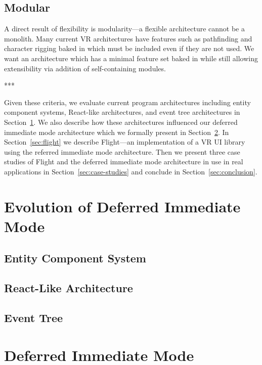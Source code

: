 \documentclass[conference,12pt]{IEEEtran}
\begin{document}
\subsection{Modular}
A direct result of flexibility is modularity---a flexible architecture cannot be
a monolith. Many current VR architectures have features such as pathfinding and
character rigging baked in which must be included even if they are not used. We
want an architecture which has a minimal feature set baked in while still
allowing extensibility via addition of self-containing modules.

\begin{center}***\end{center}

Given these criteria, we evaluate current program architectures including entity
component systems, React-like architectures, and event tree architectures in
Section~\ref{sec:evolution}. We also describe how these architectures influenced
our deferred immediate mode architecture which we formally present in
Section~\ref{sec:dim}. In Section~\ref{sec:flight} we describe Flight---an
implementation of a VR UI library using the referred immediate mode
architecture. Then we present three case studies of Flight and the deferred
immediate mode architecture in use in real applications in
Section~\ref{sec:case-studies} and conclude in Section~\ref{sec:conclusion}.

\section{Evolution of Deferred Immediate Mode}\label{sec:evolution}

\subsection{Entity Component System}

\subsection{React-Like Architecture}

\subsection{Event Tree}

\section{Deferred Immediate Mode}\label{sec:dim}
\end{document}
